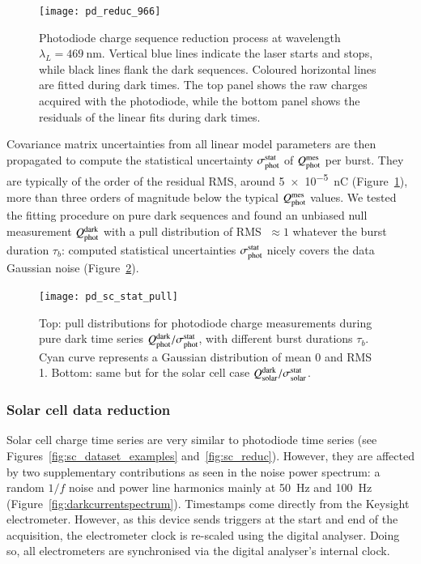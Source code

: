\begin{figure}[!h]
\centering
\texttt{[image: pd\_reduc\_966]}
\caption{Photodiode charge sequence reduction process at wavelength $\lambda_L=\SI{469}{\nm}$. Vertical blue lines indicate the laser starts and stops, while black lines flank the dark sequences. Coloured horizontal lines are fitted during dark times. The top panel shows the raw charges acquired with the photodiode, while the bottom panel shows the residuals of the linear fits during dark times.}\label{fig:pd_reduc}
\end{figure}

Covariance matrix uncertainties from all linear model parameters are then propagated to compute the statistical uncertainty $\sigma_{\mathrm{phot}}^{\mathrm{stat}}$ of $Q_{\mathrm{phot}}^{\mathrm{mes}}$ per burst. They are typically of the order of the residual RMS, around \SI{5e-5}{\nano\coulomb} (Figure~\ref{fig:pd_reduc}), more than three orders of magnitude below the typical $Q_{\mathrm{phot}}^{\mathrm{mes}}$ values. We tested the fitting procedure on pure dark sequences and found an unbiased null measurement $Q_{\mathrm{phot}}^{\rm dark}$ with a pull distribution of RMS $\;\approx 1$ whatever the burst duration $\tau_b$: computed statistical uncertainties $\sigma_{\mathrm{phot}}^{\mathrm{stat}}$ nicely covers the data Gaussian noise (Figure~\ref{fig:charge_pull}).

\begin{figure}[!h]
\centering
\texttt{[image: pd\_sc\_stat\_pull]}
\caption{Top: pull distributions for photodiode charge measurements during pure dark time series $Q_{\mathrm{phot}}^{\rm dark} / \sigma_{\mathrm{phot}}^{\mathrm{stat}}$, with different burst durations $\tau_b$. Cyan curve represents a Gaussian distribution of mean 0 and RMS 1. Bottom: same but for the solar cell case $Q_{\mathrm{solar}}^{\rm dark} / \sigma_{\mathrm{solar}}^{\mathrm{stat}}$.}\label{fig:charge_pull}
\end{figure}



\subsubsection{Solar cell data reduction}
\label{sec:solar_reduction}

Solar cell charge time series are very similar to photodiode time series (see Figures~\ref{fig:sc_dataset_examples} and~\ref{fig:sc_reduc}). However, they are affected by two supplementary contributions as seen in the noise power spectrum: a random $1/f$ noise and power line harmonics mainly at \SI{50}{\hertz} and \SI{100}{\hertz} (Figure~\ref{fig:darkcurrentspectrum}). Timestamps come directly from the Keysight electrometer. However, as this device sends triggers at the start and end of the acquisition, the electrometer clock is re-scaled using the digital analyser. Doing so, all electrometers are synchronised via the digital analyser's internal clock.


